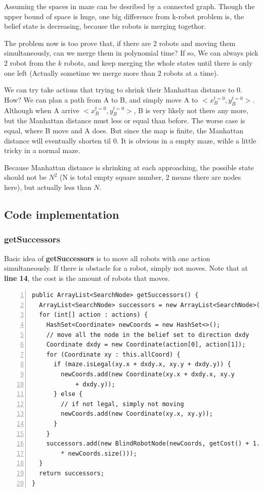 \documentclass{article}
\begin{document}
Assuming the spaces in maze can be desribed by a connected graph. Though the upper bound of space is huge, one big difference from k-robot problem is, the belief state is decreasing, because the robots is merging togethor.  

The problem now is too prove that, if there are 2 robots and moving them simultaneously, can we merge them in polynomial time? If so, We can always pick 2 robot from the $k$ robots, and keep merging the whole states until there is only one left (Actually sometime we merge more than 2 robots at a time).

We can try take actions that trying to shrink their Manhattan distance to 0. How? We can plan a path from A to B, and simply move A to $<x_{B}^{ t = 0}, y_{B}^{ t = 0}>$. Although when A arrive $<x_{B}^{ t = 0}, y_{B}^{ t = 0}>$, B is very likely not there any more, but the Manhattan distance must less or equal than before. The worse case is equal, where B move and A does. But since the map is finite, the Manhattan distance will eventually shorten til 0. It is obvious in a empty maze, wihle a little tricky in a normal maze.

Because Manhattan distance is shrinking at each approaching, the possible state should not be $N^2$ (N is total empty square number, 2 means there are nodes here), but actually less than $N$.

\subsection{Code implementation}

\subsubsection{getSuccessors}
Basic idea of \textbf{getSuccessors} is to move all robots with one action simultaneously. If there is obstacle for a robot, simply not moves. Note that at  \textbf{line 14}, the cost is the amount of robots that moves.
\begin{lstlisting}[numbers=left]
public ArrayList<SearchNode> getSuccessors() {
  ArrayList<SearchNode> successors = new ArrayList<SearchNode>();
  for (int[] action : actions) {
    HashSet<Coordinate> newCoords = new HashSet<>();
    // move all the node in the belief set to direction dxdy
    Coordinate dxdy = new Coordinate(action[0], action[1]);
    for (Coordinate xy : this.allCoord) {
      if (maze.isLegal(xy.x + dxdy.x, xy.y + dxdy.y)) {
        newCoords.add(new Coordinate(xy.x + dxdy.x, xy.y
            + dxdy.y));
      } else {
        // if not legal, simply not moving
        newCoords.add(new Coordinate(xy.x, xy.y));
      }
    }
    successors.add(new BlindRobotNode(newCoords, getCost() + 1.0
        * newCoords.size()));
  }
  return successors;
}
\end{lstlisting}
\end{document}
